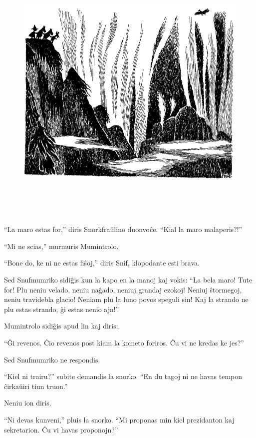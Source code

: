 \begin{figure}[htbp]
\centering
\includegraphics[width=448pt,height=371pt]{7-2.png}
\caption{}
\label{7-2}
\end{figure}

``La maro estas for,'' diris Snorkfraŭlino duonvoĉe. ``Kial la maro malaperis?!''

``Mi ne scias,'' murmuris Mumintrolo.

``Bone do, ke ni ne estas fiŝoj,'' diris Snif, klopodante esti brava.

Sed Snufmumriko sidiĝis kun la kapo en la manoj kaj vokis: ``La bela maro! Tute for! Plu neniu velado, neniu naĝado, neniuj grandaj ezokoj! Neniuj ŝtormegoj, neniu travidebla glacio! Neniam plu la luno povos speguli sin! Kaj la strando ne plu estas strando, ĝi estas nenio ajn!''

Mumintrolo sidiĝis apud lin kaj diris:

``Ĝi revenos. Ĉio revenos post kiam la kometo foriros. Ĉu vi ne kredas ke jes?''

Sed Snufmumriko ne respondis.

``Kiel ni trairu?'' subite demandis la snorko. ``En du tagoj ni ne havas tempon ĉirkaŭiri tiun truon.''

Neniu ion diris.

``Ni devas kunveni,'' pluis la snorko. ``Mi proponas min kiel prezidanton kaj sekretarion. Ĉu vi havas proponojn?''

